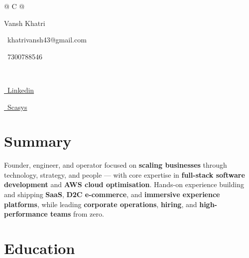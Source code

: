 \documentclass[a4paper,10pt]{article}
\begin{document}
\pagestyle{empty}




\begin{tabularx}{\linewidth}{@{} C @{}}

{\color[HTML]{1C033C} \Huge Vansh Khatri} \\[2pt]



{\color[HTML]{371e77}

\faEnvelope\ khatrivansh43@gmail.com \quad \textbar{} \quad

\faMobile\ 7300788546

} \\[2pt]



{\color[HTML]{371e77}

\href{https://www.linkedin.com/in/vansh-khatri-3589b1282/}{\faLinkedin\ Linkedin}

\quad \textbar{} \quad

\href{https://scasys.in}{\faBuilding\ Scasys}

}

\end{tabularx}




\section{Summary}

{\color[HTML]{1C033C}

Founder, engineer, and operator focused on \textbf{scaling businesses} through technology, strategy, and people — with core expertise in \textbf{full-stack software development} and \textbf{AWS cloud optimisation}. Hands-on experience building and shipping \textbf{SaaS}, \textbf{D2C e-commerce}, and \textbf{immersive experience platforms}, while leading \textbf{corporate operations}, \textbf{hiring}, and \textbf{high-performance teams} from zero.

}




\section{Education}
\end{document}
